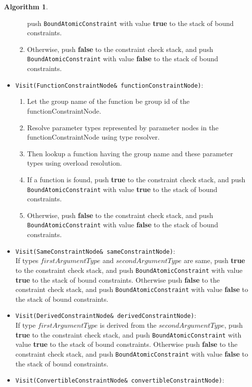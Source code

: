 \documentclass[a4paper,oneside,11pt]{book}
\theoremstyle{definition}
\newtheorem{algo}{Algorithm}[section]
\begin{document}
\begin{algo}
\begin{itemize}
\begin{enumerate}
push \verb|BoundAtomicConstraint| with value \textbf{true} to the stack of bound constraints.
\item
Otherwise, push \textbf{false} to the constraint check stack, and
push \verb|BoundAtomicConstraint| with value \textbf{false} to the stack of bound constraints.
\end{enumerate}
\item
\verb|Visit(FunctionConstraintNode& functionConstraintNode)|:\\
\begin{enumerate}
\item
Let the group name of the function be group id of the functionConstraintNode.
\item
Resolve parameter types represented by parameter nodes in the functionConstraintNode using type resolver.
\item
Then lookup a function having the group name and these parameter types using overload resolution.
\item
If a function is found, push \textbf{true} to the constraint check stack, and
push \verb|BoundAtomicConstraint| with value \textbf{true} to the stack of bound constraints.
\item
Otherwise, push \textbf{false} to the constraint check stack, and
push \verb|BoundAtomicConstraint| with value \textbf{false} to the stack of bound constraints.
\end{enumerate}
\item
\verb|Visit(SameConstraintNode& sameConstraintNode)|:\\
If types $firstArgumentType$ and $secondArgumentType$ are same, push \textbf{true} to the constraint check stack, and
push \verb|BoundAtomicConstraint| with value \textbf{true} to the stack of bound constraints.
Otherwise push \textbf{false} to the constraint check stack, and
push \verb|BoundAtomicConstraint| with value \textbf{false} to the stack of bound constraints.
\item
\verb|Visit(DerivedConstraintNode& derivedConstraintNode)|:\\
If type $firstArgumentType$ is derived from the $secondArgumentType$, push \textbf{true} to the constraint check stack, and
push \verb|BoundAtomicConstraint| with value \textbf{true} to the stack of bound constraints.
Otherwise push \textbf{false} to the constraint check stack, and
push \verb|BoundAtomicConstraint| with value \textbf{false} to the stack of bound constraints.
\item
\verb|Visit(ConvertibleConstraintNode& convertibleConstraintNode)|:\\

\end{itemize}
\end{algo}
\end{document}
